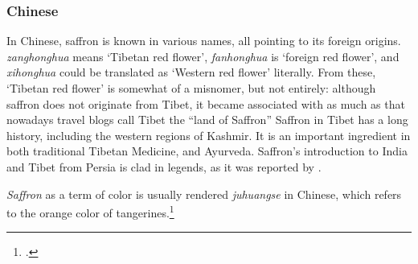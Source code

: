 \subsubsection{Chinese}



In Chinese, saffron is known in various names, all pointing to its foreign origins.  \textit{zanghonghua} means `Tibetan red flower',  \textit{fanhonghua} is `foreign red flower', and  \textit{xihonghua} could be translated as `Western red flower' literally. From these, `Tibetan red flower' is somewhat of a misnomer, but not entirely: although saffron does not originate from Tibet, it became associated with as much as that nowadays travel blogs call Tibet the ``land of Saffron'' \autocite[cf.][]{kunga_what_2017} Saffron in Tibet has a long history, including the western regions of Kashmir. It is an important ingredient in both traditional Tibetan Medicine, and Ayurveda. Saffron's introduction to India and Tibet from Persia is clad in legends, as it was reported by \textcite{dash_saffron_1976}.

\textit{Saffron} as a term of color is usually rendered  \textit{juhuangse} in Chinese, which refers to the orange color of tangerines.\footcite[saffron]{yellowbridge}




